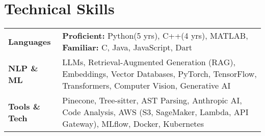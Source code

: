 \documentclass[a4paper,11pt]{article}
\begin{document}
\section{Technical Skills}
\begin{tabularx}{\linewidth}{@{}l X@{}}
\textbf{Languages} & \textbf{Proficient:} Python(5 yrs), C++(4 yrs), MATLAB, \textbf{Familiar:} C, Java, JavaScript, Dart \\
\textbf{NLP \& ML} & LLMs, Retrieval-Augmented Generation (RAG), Embeddings, Vector Databases, PyTorch, TensorFlow, Transformers, Computer Vision, Generative AI \\
\textbf{Tools \& Tech} & Pinecone, Tree-sitter, AST Parsing, Anthropic AI, Code Analysis, AWS (S3, SageMaker, Lambda, API Gateway), MLflow, Docker, Kubernetes \\
\end{tabularx}

\end{document}
